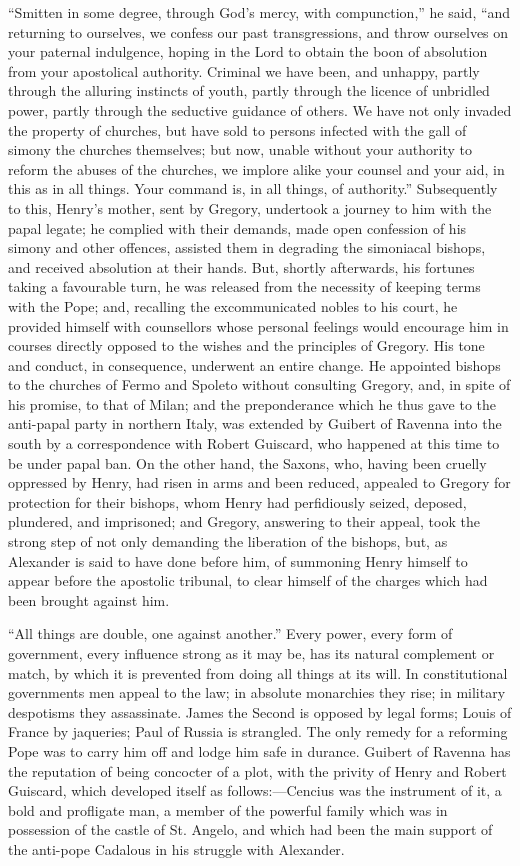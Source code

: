 ``Smitten in some degree, through God's mercy,
with compunction,'' he said, ``and returning to ourselves, we confess
our past transgressions, and throw ourselves on your paternal
indulgence, hoping in the Lord to obtain the boon of absolution from
your apostolical authority. Criminal we have been, and unhappy, partly
through the alluring instincts of youth, partly through the licence of
unbridled power, partly through the seductive guidance of others. We
have not only invaded the property of churches, but have sold to
persons infected with the gall of simony the churches themselves; but
now, unable without your authority to reform the abuses of the churches, we implore alike your counsel and your aid, in this as in
all things. Your command is, in all things, of authority.''
Subsequently to this, Henry's mother, sent by Gregory, undertook a
journey to him with the papal legate; he complied with their demands,
made open confession of his simony and other offences, assisted them
in degrading the simoniacal bishops, and received absolution at their
hands. But, shortly afterwards, his fortunes taking a favourable turn,
he was released from the necessity of keeping terms with the Pope;
and, recalling the excommunicated nobles to his court, he provided
himself with counsellors whose personal feelings would encourage him
in courses directly opposed to the wishes and the principles of
Gregory. His tone and conduct, in consequence, underwent an entire
change. He appointed bishops to the churches of Fermo and Spoleto
without consulting Gregory, and, in spite of his promise, to that of
Milan; and the preponderance which he thus gave to the anti-papal
party in northern Italy, was extended by Guibert of Ravenna into the
south by a correspondence with Robert Guiscard, who happened at this
time to be under papal ban. On the other hand, the Saxons, who, having
been cruelly oppressed by Henry, had risen in arms and been reduced,
appealed to Gregory for protection for their bishops, whom Henry had
perfidiously seized, deposed, plundered, and imprisoned; and Gregory,
answering to their appeal, took the strong step of not only demanding
the liberation of the bishops, but, as Alexander is said to have done
before him, of summoning Henry himself to appear before the apostolic
tribunal, to clear himself of the charges which had been brought
against him.

``All things are double, one against another.''
Every power, every form of government, every influence strong as
it may be, has its natural complement or match, by which it is
prevented from doing all things at its will. In constitutional
governments men appeal to the law; in absolute monarchies they rise;
in military despotisms they assassinate. James the Second is opposed
by legal forms; Louis of France by jaqueries; Paul of Russia is
strangled. The only remedy for a reforming Pope was to carry him off
and lodge him safe in durance. Guibert of Ravenna has the reputation
of being concocter of a plot, with the privity of Henry and Robert
Guiscard, which developed itself as follows:—Cencius was the
instrument of it, a bold and profligate man, a member of the powerful
family which was in possession of the castle of St. Angelo, and which
had been the main support of the anti-pope Cadalous in his struggle
with Alexander.

